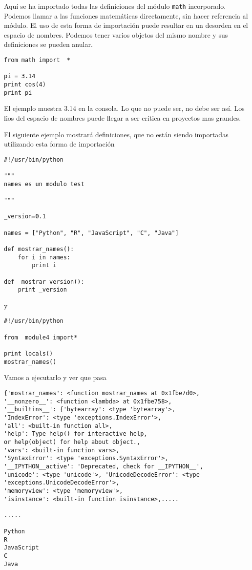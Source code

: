 \documentclass[twoside,10.5pt]{article}%
\begin{document}
Aqu\'i se ha importado todas las definiciones del m\'odulo \texttt{math} incorporado. Podemos llamar a las funciones matem\'aticas directamente, sin hacer referencia al m\'odulo. El uso de esta forma de  importaci\'on puede resultar en un desorden en el  espacio de nombres. Podemos tener varios objetos del mismo nombre y sus definiciones se pueden anular.

\begin{verbatim}
from math import  *

pi = 3.14
print cos(4)
print pi
\end{verbatim}

El ejemplo muestra 3.14 en la consola. Lo que no puede ser, no debe ser as\' i. Los lios del espacio de nombres puede llegar a ser cr\'itica en proyectos mas grandes. 

El siguiente ejemplo mostrar\'a definiciones, que no est\'an siendo importadas utilizando esta forma de importaci\'on

\begin{verbatim}
#!/usr/bin/python

"""
names es un modulo test

"""

_version=0.1

names = ["Python", "R", "JavaScript", "C", "Java"]

def mostrar_names():
    for i in names:
        print i

def _mostrar_version():
    print _version
\end{verbatim}


y 

\begin{verbatim}
#!/usr/bin/python

from  module4 import*

print locals()
mostrar_names()

\end{verbatim}



Vamos a ejecutarlo y ver que pasa

\begin{verbatim}
{'mostrar_names': <function mostrar_names at 0x1fbe7d0>,
'__nonzero__': <function <lambda> at 0x1fbe758>, 
'__builtins__': {'bytearray': <type 'bytearray'>,
'IndexError': <type 'exceptions.IndexError'>,
'all': <built-in function all>,
'help': Type help() for interactive help,
or help(object) for help about object.,
'vars': <built-in function vars>,
'SyntaxError': <type 'exceptions.SyntaxError'>,
'__IPYTHON__active': 'Deprecated, check for __IPYTHON__',
'unicode': <type 'unicode'>, 'UnicodeDecodeError': <type 'exceptions.UnicodeDecodeError'>, 
'memoryview': <type 'memoryview'>, 
'isinstance': <built-in function isinstance>,.....

.....

Python
R
JavaScript
C
Java
\end{verbatim}
\end{document}
